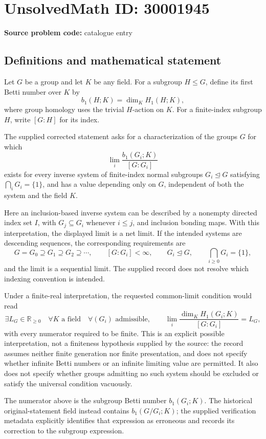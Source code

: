 \documentclass[11pt]{article}
\newcommand{\R}{\mathbb{R}}
\begin{document}
\section*{UnsolvedMath ID: 30001945}
\textbf{Source problem code:} catalogue entry
\subsection{Definitions and mathematical statement}
Let \(G\) be a group and let \(K\) be any field. For a subgroup \(H\leq G\), define its first Betti number over \(K\) by
\[
b_1(H;K)=\dim_K H_1(H;K),
\]
where group homology uses the trivial \(H\)-action on \(K\). For a finite-index subgroup \(H\), write \([G:H]\) for its index.

The supplied corrected statement asks for a characterization of the groups \(G\) for which
\[
\lim_i\frac{b_1(G_i;K)}{[G:G_i]}
\]
exists for every inverse system of finite-index normal subgroups \(G_i\trianglelefteq G\) satisfying \(\bigcap_iG_i=\{1\}\), and has a value depending only on \(G\), independent of both the system and the field \(K\).

Here an inclusion-based inverse system can be described by a nonempty directed index set \(I\), with \(G_j\subseteq G_i\) whenever \(i\leq j\), and inclusion bonding maps. With this interpretation, the displayed limit is a net limit. If the intended systems are descending sequences, the corresponding requirements are
\[
G=G_0\supseteq G_1\supseteq G_2\supseteq\cdots,
\qquad [G:G_i]<\infty,
\qquad G_i\trianglelefteq G,
\qquad \bigcap_{i\geq0}G_i=\{1\},
\]
and the limit is a sequential limit. The supplied record does not resolve which indexing convention is intended.

Under a finite-real interpretation, the requested common-limit condition would read
\[
\exists L_G\in\R_{\geq0}\quad
\forall K\text{ a field}\quad
\forall (G_i)\text{ admissible},\qquad
\lim_i\frac{\dim_K H_1(G_i;K)}{[G:G_i]}=L_G,
\]
with every numerator required to be finite. This is an explicit possible interpretation, not a finiteness hypothesis supplied by the source: the record assumes neither finite generation nor finite presentation, and does not specify whether infinite Betti numbers or an infinite limiting value are permitted. It also does not specify whether groups admitting no such system should be excluded or satisfy the universal condition vacuously.

The numerator above is the subgroup Betti number \(b_1(G_i;K)\). The historical original-statement field instead contains \(b_1(G/G_i;K)\); the supplied verification metadata explicitly identifies that expression as erroneous and records its correction to the subgroup expression.
\end{document}
